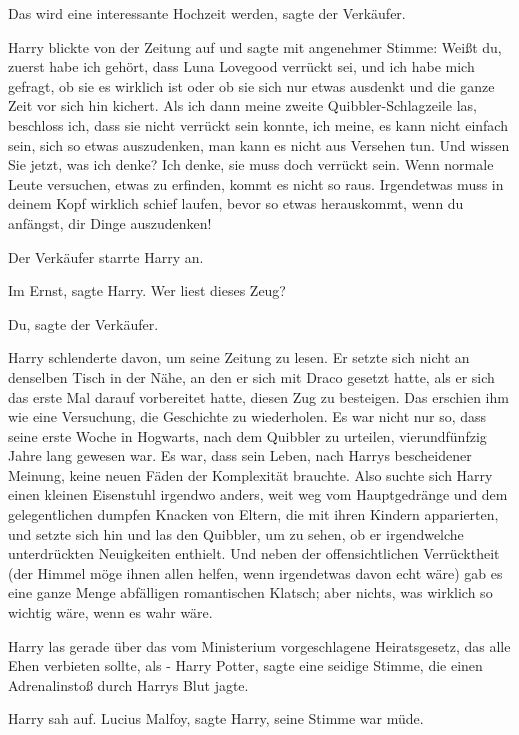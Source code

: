\glqq{}Das wird eine interessante Hochzeit werden\grqq{}, sagte der Verkäufer.

Harry blickte von der Zeitung auf und sagte mit angenehmer Stimme: \glqq{}Weißt
du, zuerst habe ich gehört, dass Luna Lovegood verrückt sei, und ich habe mich
gefragt, ob sie es wirklich ist oder ob sie sich nur etwas ausdenkt und die
ganze Zeit vor sich hin kichert. Als ich dann meine zweite Quibbler-Schlagzeile
las, beschloss ich, dass sie nicht verrückt sein konnte, ich meine, es kann
nicht einfach sein, sich so etwas auszudenken, man kann es nicht aus Versehen
tun. Und wissen Sie jetzt, was ich denke? Ich denke, sie muss doch verrückt
sein. Wenn normale Leute versuchen, etwas zu erfinden, kommt es nicht so raus.
Irgendetwas muss in deinem Kopf wirklich schief laufen, bevor so etwas
herauskommt, wenn du anfängst, dir Dinge auszudenken!\grqq{}

Der Verkäufer starrte Harry an.

\glqq{}Im Ernst\grqq{}, sagte Harry. \glqq{}Wer liest dieses Zeug?\grqq{}

\glqq{}Du\grqq{}, sagte der Verkäufer.

Harry schlenderte davon, um seine Zeitung zu lesen. Er setzte sich nicht an
denselben Tisch in der Nähe, an den er sich mit Draco gesetzt hatte, als er sich
das erste Mal darauf vorbereitet hatte, diesen Zug zu besteigen. Das erschien
ihm wie eine Versuchung, die Geschichte zu wiederholen. Es war nicht nur so,
dass seine erste Woche in Hogwarts, nach dem Quibbler zu urteilen,
vierundfünfzig Jahre lang gewesen war. Es war, dass sein Leben, nach Harrys
bescheidener Meinung, keine neuen Fäden der Komplexität brauchte. Also suchte
sich Harry einen kleinen Eisenstuhl irgendwo anders, weit weg vom Hauptgedränge
und dem gelegentlichen dumpfen Knacken von Eltern, die mit ihren Kindern
apparierten, und setzte sich hin und las den Quibbler, um zu sehen, ob er
irgendwelche unterdrückten Neuigkeiten enthielt. Und neben der offensichtlichen
Verrücktheit (der Himmel möge ihnen allen helfen, wenn irgendetwas davon echt
wäre) gab es eine ganze Menge abfälligen romantischen Klatsch; aber nichts, was
wirklich so wichtig wäre, wenn es wahr wäre.

Harry las gerade über das vom Ministerium vorgeschlagene Heiratsgesetz, das alle
Ehen verbieten sollte, als - \glqq{}Harry Potter\grqq{}, sagte eine seidige
Stimme, die einen Adrenalinstoß durch Harrys Blut jagte.

Harry sah auf. \glqq{}Lucius Malfoy\grqq{}, sagte Harry, seine Stimme war müde.

